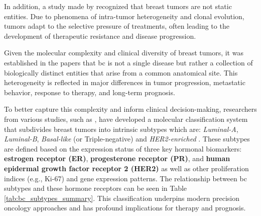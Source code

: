 In addition, a study made by \textcite{origins_and_evolution_bca_Polyak2007}
recognized that breast tumors are not static entities. Due to phenomena of
intra-tumor heterogeneity and clonal evolution, tumors adapt to the selective
pressure of treatments, often leading to the development of therapeutic
resistance and disease progression.

Given the molecular complexity and clinical diversity of breast tumors, it was
established in the papers
\textcite{clinical_implication_bca_Adamo2015,bc_subtypes_Prat2015Clinical} that
\gls{bc} is not a single disease but rather a collection of biologically
distinct entities that arise from a common anatomical site. This heterogeneity
is reflected in major differences in tumor progression, metastatic behavior,
response to therapy, and long-term prognosis.

To better capture this complexity and inform clinical decision-making,
researchers from various studies, such as
\textcite{bc_molecular_Perou2000,bc_subtypes_Prat2015Clinical}, have developed
a molecular classification system that subdivides breast tumors into intrinsic
subtypes which are: \textit{Luminal-A}, \textit{Luminal-B}, \textit{Basal-like}
(or Triple-negative) and \textit{HER2-enriched} . These subtypes are defined
based on the expression status of three key hormonal biomarkers:
\textbf{estrogen receptor (ER)}, \textbf{progesterone receptor (PR)}, and
\textbf{human epidermal growth factor receptor 2 (HER2)} as well as other
proliferation indices (e.g., Ki-67) and gene expression patterns. The
relationship between \gls{bc} subtypes and these hormone receptors can be seen
in Table \ref{tab:bc_subtypes_summary}. This classification underpins modern
precision oncology approaches and has profound implications for therapy and
prognosis.

